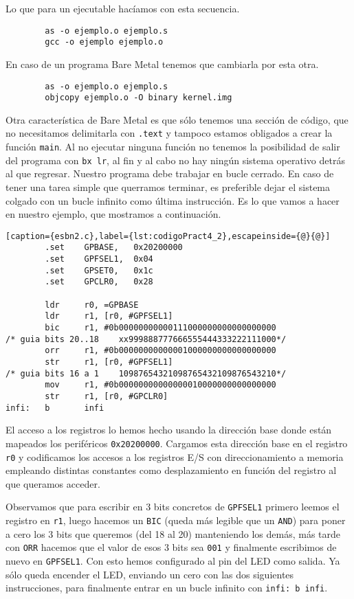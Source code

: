 Lo que para un ejecutable hacíamos con esta secuencia.
\begin{lstlisting}
        as -o ejemplo.o ejemplo.s
        gcc -o ejemplo ejemplo.o
\end{lstlisting}

En caso de un programa Bare Metal tenemos que cambiarla por esta otra.
\begin{lstlisting}
        as -o ejemplo.o ejemplo.s
        objcopy ejemplo.o -O binary kernel.img
\end{lstlisting}

Otra característica de Bare Metal es que sólo tenemos una sección de código, que no
necesitamos delimitarla con {\tt .text} y tampoco estamos obligados a crear la función
{\tt main}. Al no ejecutar ninguna función no tenemos la posibilidad de salir del
programa con {\tt bx lr}, al fin y al cabo no hay ningún sistema operativo detrás al
que regresar. Nuestro programa debe trabajar en bucle cerrado. En caso de tener una
tarea simple que querramos terminar, es preferible dejar el sistema colgado con un
bucle infinito como última instrucción. Es lo que vamos a hacer en nuestro ejemplo,
que mostramos a continuación.

\begin{lstlisting}[caption={esbn2.c},label={lst:codigoPract4_2},escapeinside={@}{@}]
        .set    GPBASE,   0x20200000
        .set    GPFSEL1,  0x04
        .set    GPSET0,   0x1c
        .set    GPCLR0,   0x28

        ldr     r0, =GPBASE
        ldr     r1, [r0, #GPFSEL1]
        bic     r1, #0b00000000000111000000000000000000
/* guia bits 20..18    xx999888777666555444333222111000*/
        orr     r1, #0b00000000000001000000000000000000
        str     r1, [r0, #GPFSEL1]
/* guia bits 16 a 1    10987654321098765432109876543210*/
        mov     r1, #0b00000000000000010000000000000000
        str     r1, [r0, #GPCLR0]
infi:   b       infi
\end{lstlisting}

El acceso a los registros lo hemos hecho usando la dirección base donde
están mapeados los periféricos {\tt 0x20200000}. Cargamos esta dirección
base en el registro {\tt r0} y codificamos los accesos a los registros
E/S con direccionamiento a memoria empleando distintas constantes como
desplazamiento en función del registro al que queramos acceder.

Observamos que para escribir en 3 bits concretos de {\tt GPFSEL1} primero leemos
el registro en {\tt r1}, luego hacemos un {\tt BIC} (queda más legible que un {\tt AND})
para poner a cero los 3 bits que queremos (del 18 al 20) manteniendo los demás,
más tarde con {\tt ORR} hacemos que el valor de esos 3 bits sea {\tt 001} y finalmente
escribimos de nuevo en {\tt GPFSEL1}. Con esto hemos configurado al pin del LED como salida.
Ya sólo queda encender el LED, enviando un cero con las dos siguientes instrucciones, para
finalmente entrar en un bucle infinito con {\tt infi: b infi}.


